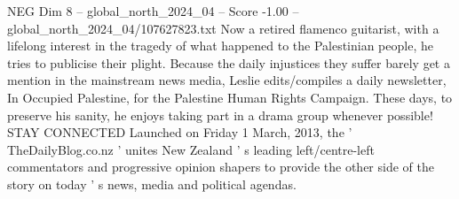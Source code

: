 \begin{textsample}{NEG Dim 8 – global\_north\_2024\_04 – Score -1.00 – global\_north\_2024\_04/107627823.txt}
Now a retired flamenco guitarist, with a lifelong interest in the tragedy of what happened to the Palestinian people, he tries to publicise their plight.
Because the daily injustices they suffer barely get a mention in the mainstream news media, Leslie edits/compiles a daily newsletter, In Occupied Palestine, for the Palestine Human Rights Campaign.
These days, to preserve his sanity, he enjoys taking part in a drama group whenever possible!
STAY CONNECTED Launched on Friday 1 March, 2013, the ' TheDailyBlog.co.nz ' unites New Zealand ' s leading left/centre-left commentators and progressive opinion shapers to provide the other side of the story on today ' s news, media and political agendas.

\end{textsample}
